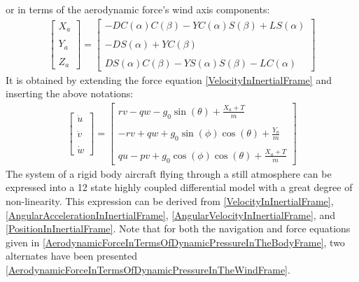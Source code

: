 \documentclass[conference]{IEEEtran}
\begin{document}
or in terms of the aerodynamic force's wind axis components:
\begin{align}
    \begin{bmatrix}
        X_a \\\\
        Y_a \\\\
        Z_a
    \end{bmatrix}=
    \begin{bmatrix}
        -D{C(\alpha)}{C(\beta)}-Y{C(\alpha)}{S(\beta)}+L{S(\alpha)} \\\\
        -D{S(\alpha)}+Y{C(\beta)}                                   \\\\
        D{S(\alpha)}{C(\beta)}-Y{S(\alpha)}{S(\beta)}-L{C(\alpha)}
    \end{bmatrix}
    \label{AerodynamicBodyCoefficientsDefinedInTermsOfAerodynamicForces}
\end{align}
It is obtained by extending the force equation {\ref{VelocityInInertialFrame}} and inserting the above notations:
\begin{align}
    \begin{bmatrix}
        \dot{u} \\\\
        \dot{v} \\\\
        \dot{w}
    \end{bmatrix}=
    \begin{bmatrix}
        rv-qw-g_0\sin(\theta)+\frac{X_a+T}{m}          \\\\
        -rv+qw+g_0\sin(\phi)\cos(\theta)+\frac{Y_a}{m} \\\\
        qu-pv+g_0\cos(\phi)\cos(\theta)+\frac{X_a+T}{m}
    \end{bmatrix}
    \label{AccelerationInInertialFrameDiffEquation}
\end{align}
The system of a rigid body aircraft flying through a still atmosphere can be expressed into a 12 state highly coupled differential model with a great degree of non-linearity. This expression can be derived from {\ref{VelocityInInertialFrame}}, {\ref{AngularAccelerationInInertialFrame}}, {\ref{AngularVelocityInInertialFrame}}, and {\ref{PositionInInertialFrame}}.
Note that for both the navigation and force equations given in  {\ref{AerodynamicForceInTermsOfDynamicPressureInTheBodyFrame}}, two alternates have been presented {\ref{AerodynamicForceInTermsOfDynamicPressureInTheWindFrame}}.
\end{document}
